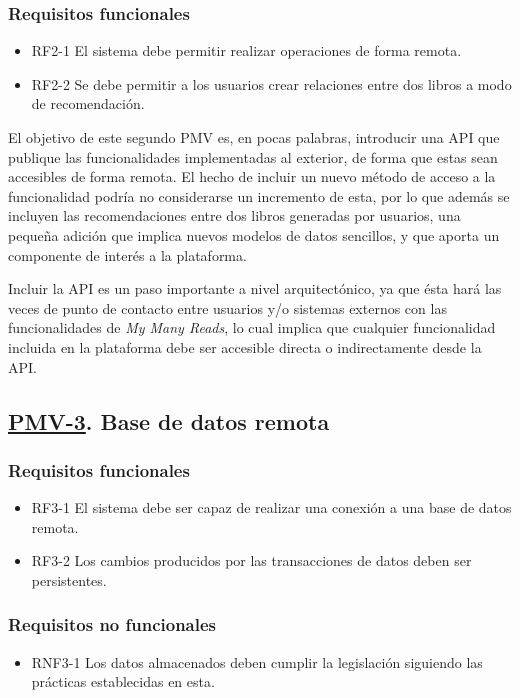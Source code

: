 \subsubsection{Requisitos funcionales}
\begin{itemize}
    \item RF2-1 El sistema debe permitir realizar operaciones de forma remota.
    \item RF2-2 Se debe permitir a los usuarios crear relaciones entre dos libros a modo de recomendación.
\end{itemize}

El objetivo de este segundo PMV es, en pocas palabras, introducir una API que publique las funcionalidades implementadas al exterior, de forma que estas sean accesibles de forma remota. El hecho de incluir un nuevo método de acceso a la funcionalidad podría no considerarse un incremento de esta, por lo que además se incluyen las recomendaciones entre dos libros generadas por usuarios, una pequeña adición que implica nuevos modelos de datos sencillos, y que aporta un componente de interés a la plataforma.

Incluir la API es un paso importante a nivel arquitectónico, ya que ésta hará las veces de punto de contacto entre usuarios y/o sistemas externos con las funcionalidades de \textit{My Many Reads}, lo cual implica que cualquier funcionalidad incluida en la plataforma debe ser accesible directa o indirectamente desde la API.

\subsection{\href{https://github.com/Anglepi/My-Many-Reads/milestone/5}{PMV-3}. Base de datos remota}

\subsubsection{Requisitos funcionales}
\begin{itemize}
    \item RF3-1 El sistema debe ser capaz de realizar una conexión a una base de datos remota.
    \item RF3-2 Los cambios producidos por las transacciones de datos deben ser persistentes.
\end{itemize}

\subsubsection{Requisitos no funcionales}
\begin{itemize}
    \item RNF3-1 Los datos almacenados deben cumplir la legislación siguiendo las prácticas establecidas en esta.
\end{itemize}

